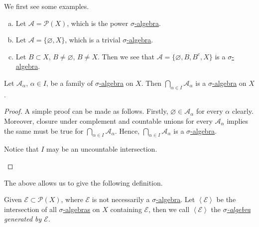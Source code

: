 \begin{eg}
	We first see some examples.
	\begin{enumerate}[(a)]
		\item Let \(\mathcal{A} = \mathcal{P} (X)\), which is the power \hyperref[def:sigma-algebra]{\(\sigma\)-algebra}.
		\item Let \(\mathcal{A} = \{\varnothing , X\}\), which is a trivial \hyperref[def:sigma-algebra]{\(\sigma\)-algebra}.
		\item Let \(B\subset X\), \(B\neq \varnothing \), \(B\neq X\). Then we see that \(\mathcal{A} = \{\varnothing , B, B^{c}, X\}\) is a \hyperref[def:sigma-algebra]{\(\sigma\)-algebra}.
	\end{enumerate}
\end{eg}

\begin{lemma}
	Let \(\mathcal{A}_{\alpha}\), \(\alpha\in I\), be a family of \hyperref[def:sigma-algebra]{\(\sigma\)-algebra} on \(X\). Then \(\bigcap_{\alpha\in I} \mathcal{A}_{\alpha}\) is a \hyperref[def:sigma-algebra]{\(\sigma\)-algebra} on \(X\).
\end{lemma}
\begin{proof}
	A simple proof can be made as follows. Firstly, \(\varnothing \in \mathcal{A}_{\alpha}\) for every \(\alpha\) clearly.
	Moreover, closure under complement and countable unions for every \(\mathcal{A}_{\alpha}\) implies the same must be true for \(\bigcap_{\alpha\in I} \mathcal{A}_{\alpha}\).
	Hence, \(\bigcap_{\alpha\in I} \mathcal{A}_{\alpha}\) is a \hyperref[def:sigma-algebra]{\(\sigma\)-algebra}.
	\begin{remark}
		Notice that \(I\) may be an uncountable intersection.
	\end{remark}
\end{proof}

The above allows us to give the following definition.
\begin{definition}\label{def:generation-of-sigma-algebra}
	Given \(\mathcal{E} \subset \mathcal{P} (X) \), where \(\mathcal{E}\) is not necessarily a \hyperref[def:sigma-algebra]{\(\sigma\)-algebra}. Let
	\(\left<\mathcal{E}\right>\) be the intersection of all \hyperref[def:sigma-algebra]{\(\sigma\)-algebras} on \(X\) containing \(\mathcal{E}\), then
	we call \(\left<\mathcal{E} \right>\) the \emph{\hyperref[def:sigma-algebra]{\(\sigma\)-algebra} generated by \(\mathcal{E}\)}.
\end{definition}

